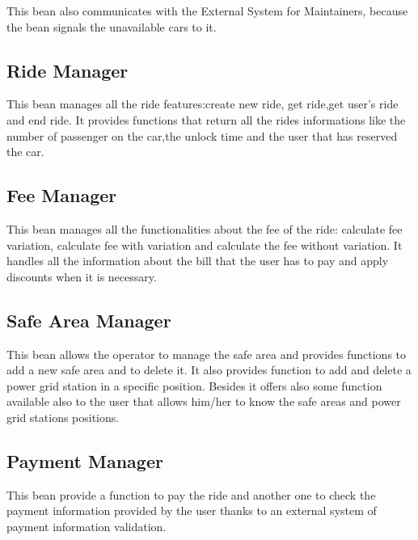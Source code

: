 This bean also communicates with the External System for Maintainers, because the bean signals the unavailable cars to it.

\subsection{Ride Manager}
This bean manages all the ride features:create new ride, get ride,get user's ride and end ride.
It provides functions that return all the rides informations like the number of passenger on the car,the unlock time and the user that has reserved the car.

\subsection{Fee Manager}
This bean manages all the functionalities about the fee of the ride: calculate fee variation, calculate fee with variation and calculate the fee without variation.
It handles all the information about the bill that the user has to pay and apply discounts when it is necessary.

\subsection{Safe Area Manager}
This bean allows the operator to manage the safe area and provides functions to add a new safe area and to delete it. It also provides function to add and delete a power grid station in a specific position.
Besides it offers also some function available also to the user that allows him/her to know the safe areas and power grid stations positions.

\subsection{Payment Manager}
This bean provide a function to pay the ride and another one to check the payment information provided by the user thanks to an external system of payment information validation.